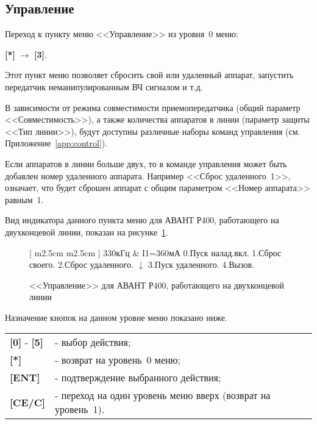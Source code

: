 \subsection{Управление}	\label{ssec:control}

Переход к пункту меню <<Управление>> из уровня~0 меню: 

\textbf{[*]} $\rightarrow$ \textbf{[3]}.

Этот пункт меню позволяет сбросить свой или удаленный аппарат, запустить передатчик неманипулированным ВЧ сигналом и т.д. 

В зависимости от режима совместимости приемопередатчика (общий параметр <<Совместимость>>), а также количества аппаратов в линии (параметр защиты <<Тип линии>>), будут доступны различные наборы команд управления (см. Приложение~\ref{app:control}). 

Если аппаратов в линии больше двух, то в команде управления может быть добавлен номер удаленного аппарата. Например <<Сброс удаленного~1>>, означает, что будет сброшен аппарат с общим параметром <<Номер аппарата>> равным~1.

Вид индикатора данного пункта меню для АВАНТ Р400, работающего на двухконцевой линии, показан на рисунке~\ref{fig:control}. 

\begin{figure}[H]
	\centering
	
	\begin{tabular}{| m{2.5cm}  m{2.5cm} |}
		\firsthline
		330кГц	& \raggedleft I1=360мА				\tabularnewline 
		 {0.Пуск налад.вкл.}	\tabularnewline 
		 {1.Сброс своего. }		\tabularnewline 
		 {2.Сброс удаленного.} 	\tabularnewline \hline
		 {$\downarrow$}			\tabularnewline
		 {3.Пуск удаленного.} 	\tabularnewline 
		 {4.Вызов.}				\tabularnewline 
		\lasthline
	\end{tabular} 
	
	\caption{<<Управление>> для АВАНТ Р400, работающего на двухконцевой линии}
	\label{fig:control}
\end{figure}

Назначение кнопок на данном уровне меню показано ниже.
\begin{center}
	\begin{tabular}{p{2cm} p{15cm}}
		\textbf{[0]} - \textbf{[5]} & - выбор действия; \tabularnewline 
		\textbf{[*]} 	& - возврат на уровень~0 меню; \tabularnewline
		\textbf{[ENT]} 	& - подтверждение выбранного действия; \tabularnewline
		\textbf{[CE/C]} & - переход на один уровень меню вверх (возврат на уровень~1). \tabularnewline				
	\end{tabular} 
\end{center}